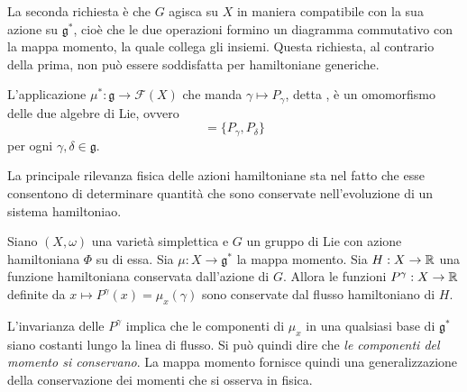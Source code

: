 \begin{remark}
  La seconda richiesta è che $G$ agisca su $X$ in maniera compatibile con la sua azione su $\mathfrak{g}^*$, cioè che le due operazioni formino un diagramma commutativo con la mappa momento, la quale collega gli insiemi. Questa richiesta, al contrario della prima, non può essere soddisfatta per hamiltoniane generiche.
\end{remark}
\begin{remark}
  L'applicazione $\mu^*:\mathfrak{g} \to \mathcal{F}(X)$ che manda $\gamma \mapsto P_{\gamma}$, detta , è un omomorfismo delle due algebre di Lie, ovvero 
  \begin{equation*}
  [\gamma,\delta] = \{P_{\gamma}, P_{\delta}\} 
  \end{equation*} 
  per ogni $\gamma,\delta \in \mathfrak{g}$.
\end{remark}

La principale rilevanza fisica delle azioni hamiltoniane sta nel fatto che esse consentono di determinare quantità che sono conservate nell'evoluzione di un sistema hamiltoniao.

\begin{theorem}
  Siano $(X,\omega)$ una varietà simplettica e $G$ un gruppo di Lie con azione hamiltoniana $\Phi$ su di essa. Sia $\mu: X\to \mathfrak{g}^*$ la mappa momento. Sia $H: X\to \mathbb{R}$ una funzione hamiltoniana conservata dall'azione di $G$. Allora le funzioni $P^{\gamma}: X\to \mathbb{R}$ definite da $x \mapsto P^{\gamma}(x) = \mu_x(\gamma)$ sono conservate dal flusso hamiltoniano di $H$.
\end{theorem}
\begin{remark}
  L'invarianza delle $P^{\gamma}$ implica che le componenti di $\mu_x$ in una qualsiasi base di $\mathfrak{g}^*$ siano costanti lungo la linea di flusso. Si può quindi dire che \emph{le componenti del momento si conservano}. La mappa momento fornisce quindi una generalizzazione della conservazione dei momenti che si osserva in fisica.
\end{remark}

